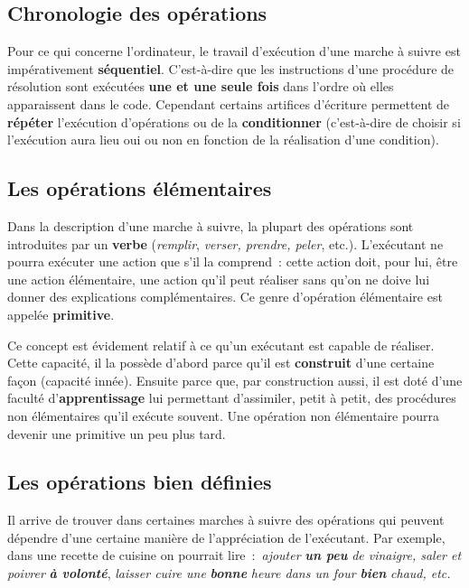 	\subsection{Chronologie des opérations}

		Pour ce qui concerne l’ordinateur, le travail d’exécution d’une marche à
		suivre est impérativement \textbf{séquentiel}. C’est-à-dire que les
		instructions d’une procédure de résolution sont exécutées \textbf{une
		et une seule fois} dans l’ordre où elles apparaissent dans le code.
		Cependant certains artifices d’écriture permettent de \textbf{répéter}
		l’exécution d’opérations ou de la \textbf{conditionner}
		(c’est-à-dire de choisir si
		l’exécution aura lieu oui ou non en fonction de la
		réalisation d’une condition).

	\subsection{Les opérations élémentaires}


		Dans la description d’une marche à suivre, la plupart des opérations
		sont introduites par un \textbf{verbe
		}(\textit{remplir}, \textit{verser, prendre, peler},
		etc.). L’exécutant ne pourra exécuter une action que s’il la comprend~:
		cette action doit, pour lui, être une action élémentaire, une action
		qu’il peut réaliser sans qu’on ne doive lui donner des explications
		complémentaires. Ce genre d’opération élémentaire est appelée
		\textbf{primitive}.
		
		Ce concept est évidement relatif à ce qu’un exécutant est capable de
		réaliser. Cette capacité, il la possède d’abord parce qu’il est
		\textbf{construit} d’une certaine façon (capacité innée). Ensuite parce
		que, par construction aussi, il est doté d’une faculté
		d’\textbf{apprentissage} lui permettant d’assimiler, petit à petit, des
		procédures non élémentaires qu’il exécute souvent. Une opération non
		élémentaire pourra devenir une primitive un peu plus tard.
		
	\subsection{Les opérations bien définies}

		Il arrive de trouver dans certaines marches à suivre des opérations qui
		peuvent dépendre d’une certaine manière de l’appréciation de
		l’exécutant. Par exemple, dans une recette de cuisine on pourrait 
		lire~:~\textit{ajouter} \textbf{\textit{un peu}} \textit{de vinaigre,
		saler et poivrer} \textbf{\textit{à volonté}}, \textit{laisser cuire
		une} \textbf{\textit{bonne}}\textit{ heure dans un four
		}\textbf{\textit{bien}} \textit{chaud, etc.}
		
